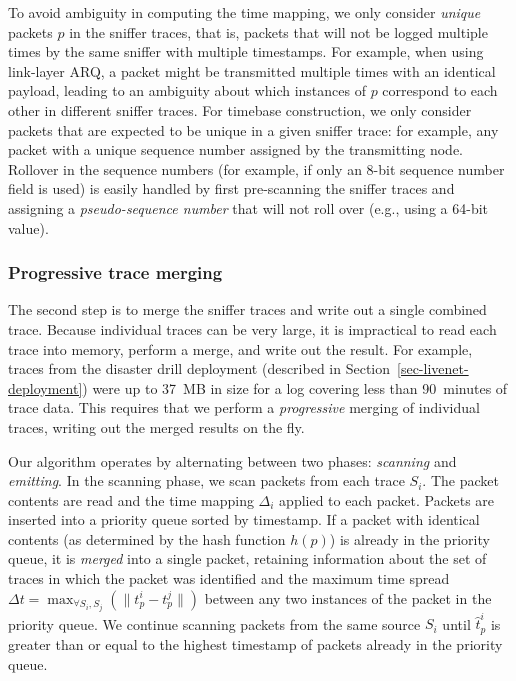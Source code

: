 To avoid ambiguity in computing the time mapping, we only consider 
{\em unique} packets $p$ in the sniffer traces, that is, packets that 
will not be logged multiple times by the same sniffer with 
multiple timestamps. For example, when using link-layer ARQ, a packet
might be transmitted multiple times with an identical payload,
leading to an ambiguity about which instances of $p$ correspond to 
each other in different sniffer traces. 
For timebase construction, we only consider packets that are expected
to be unique in a given sniffer trace: for example, any packet with a
unique sequence number assigned by the transmitting node.
Rollover in the sequence numbers (for example, if only an
8-bit sequence number field is used) is easily handled by
first pre-scanning the sniffer traces and assigning a {\em
pseudo-sequence number} that will not roll over (e.g., using a 64-bit
value).

\subsubsection{Progressive trace merging}

The second step is to merge the sniffer traces and write out a single
combined trace. Because individual traces can be very large, it is
impractical to read each trace into memory, perform a merge, and
write out the result. For example, traces from the disaster drill
deployment (described in Section~\ref{sec-livenet-deployment}) were up to 
37~MB in size for a log covering less than 90~minutes of trace data.
This requires that we perform a {\em progressive} merging of
individual traces, writing out the merged results on the fly. 

Our algorithm operates by alternating between two phases: 
{\em scanning} and {\em emitting}. 
In the scanning phase, we scan packets from each trace 
$S_i$. The packet contents are read and the time
mapping $\Delta_i$ applied to each packet. Packets are inserted
into a priority queue sorted by timestamp. If a packet with
identical contents (as determined by the hash function $h(p)$) is
already in the priority queue, it is {\em merged} into a single
packet, retaining information about the set of traces in which the
packet was identified and the maximum time spread 
$\Delta t = \max_{\forall S_i,S_j} (\|t_p^i - t_p^j\|)$ between 
any two instances of the packet in the priority queue. We continue
scanning packets from the same source $S_i$ until $\hat{t}_p^i$ 
is greater than or equal to the highest timestamp of packets already 
in the priority queue.


